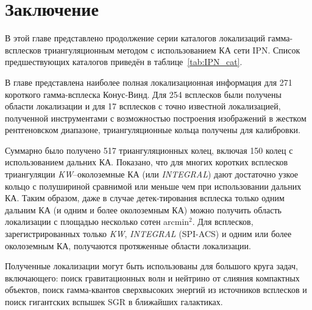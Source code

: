 \section{Заключение}
В этой главе представлено продолжение серии каталогов локализаций гамма-всплесков 
триангуляционным методом с использованием КА сети IPN. Список предшествующих каталогов 
приведён в таблице~\ref{tab:IPN_cat}.

В главе представлена наиболее полная локализационная информация для 271 короткого 
гамма-всплеска Конус-Винд. Для 254 всплесков были получены области локализации и 
для 17 всплесков с точно известной локализацией, полученной инструментами с 
возможностью построения изображений в жестком рентгеновском диапазоне, триангуляционные
кольца получены для калибровки.

Суммарно было получено 517 триангуляционных колец, включая 150 колец с использованием 
дальних КА. Показано, что для многих коротких всплесков триангуляции 
\textit{KW}--околоземные КА (или \textit{INTEGRAL}) дают достаточно узкое кольцо 
с полушириной сравнимой или меньше чем при использовании дальних КА. Таким образом, 
даже в случае детек-тирования всплеска только одним дальним КА (и одним и более 
околоземным КА) можно получить область локализации с площадью несколько 
сотен arcmin$^2$. Для всплесков, зарегистрированных только \textit{KW}, 
\textit{INTEGRAL} (SPI-ACS) и одним или более околоземным КА, получаются 
протяженные области локализации.

Полученные локализации могут быть использованы для большого круга задач, включающего: 
поиск гравитационных волн и нейтрино от слияния компактных объектов, 
поиск гамма-квантов сверхвысоких энергий из источников всплесков и поиск гигантских 
вспышек SGR в ближайших галактиках.

